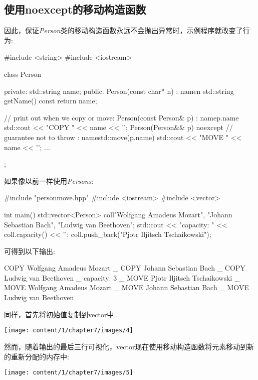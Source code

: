 \subsection{使用noexcept的移动构造函数}

因此，保证\textit{Person}类的移动构造函数永远不会抛出异常时，示例程序就改变了行为:

\begin{cppcode}
#include <string>
#include <iostream>

class Person {
	private:
	std::string name;
	public:
	Person(const char* n)
	: name{n} {
	}
	std::string getName() const {
		return name;
	}

	// print out when we copy or move:
	Person(const Person& p)
	: name{p.name} {
		std::cout << "COPY " << name << '\n';
	}
	Person(Person&& p) noexcept // guarantee not to throw
	: name{std::move(p.name)} {
		std::cout << "MOVE " << name << '\n';
	}
	...
};
\end{cppcode}

如果像以前一样使用\textit{Persons}:

\begin{cppcode}
#include "personmove.hpp"
#include <iostream>
#include <vector>

int main()
{
	std::vector<Person> coll{"Wolfgang Amadeus Mozart",
		"Johann Sebastian Bach",
		"Ludwig van Beethoven"};
	std::cout << "capacity: " << coll.capacity() << '\n';
	coll.push_back("Pjotr Iljitsch Tschaikowski");
}
\end{cppcode}

可得到以下输出:

\begin{shell}
COPY Wolfgang Amadeus Mozart _ 
COPY Johann Sebastian Bach _
COPY Ludwig van Beethoven _
capacity: 3 _
MOVE Pjotr Iljitsch Tschaikowski _
MOVE Wolfgang Amadeus Mozart _
MOVE Johann Sebastian Bach _
MOVE Ludwig van Beethoven
\end{shell}

同样，首先将初始值复制到vector中

\begin{center}
	\texttt{[image: content/1/chapter7/images/4]}
\end{center}

然而，随着输出的最后三行可视化，vector现在使用移动构造函数将元素移动到新的重新分配的内存中:

\begin{center}
	\texttt{[image: content/1/chapter7/images/5]}
\end{center}

